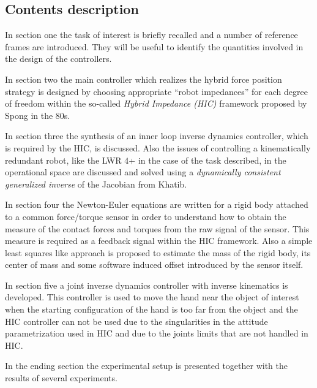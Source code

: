 \subsection*{Contents description}
In section one the task of interest is briefly recalled
and a number of reference frames are introduced. They will be useful
to identify the quantities involved in the design of the controllers.
\par
In section two the main controller which realizes the hybrid
force position strategy is designed by choosing appropriate ``robot impedances''
for each degree of freedom within the so-called \emph{Hybrid Impedance (HIC)} framework
proposed by Spong in the 80s.
\par
In section three the synthesis of an inner loop inverse dynamics
controller, which is required by the HIC, is discussed. Also the issues of
controlling a kinematically redundant robot, like the LWR $4$+ in the case
of the task described, in the operational space
are discussed and solved using a \emph{dynamically consistent
generalized inverse} of the Jacobian from Khatib.
\par
In section four the Newton-Euler equations are written for
a rigid body attached to a common force/torque sensor in order to understand
how to obtain the measure of the contact forces and torques from the raw
signal of the sensor. This measure is required as a feedback signal within the
HIC framework. Also a simple least squares like approach is proposed
to estimate the mass of the rigid body, its center of mass and some software
induced offset introduced by the sensor itself.
\par
In section five a joint inverse dynamics controller with inverse
kinematics is developed. This controller is used to move the hand near
the object of interest when the starting configuration of the hand
is too far from the object and the HIC controller can not be used due
to the singularities in the attitude parametrization used in HIC
and due to the joints limits that are not handled in HIC.

\par
In the ending section the experimental setup is presented together with
the results of several experiments.
\newpage
